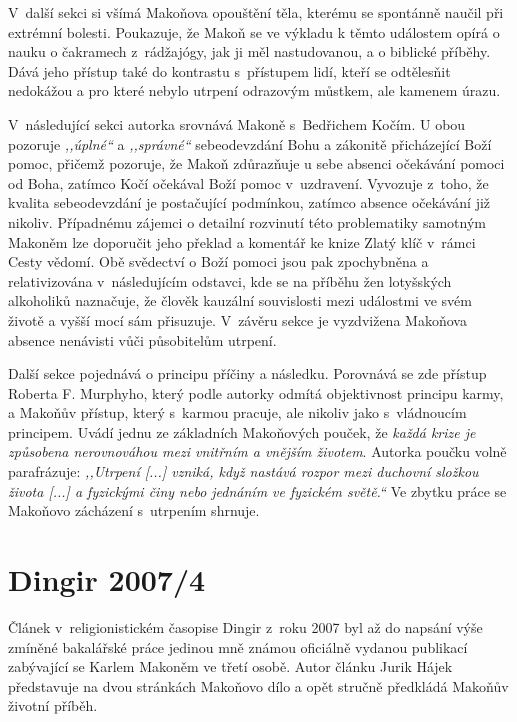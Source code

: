 V~další sekci si všímá Makoňova opouštění těla, kterému se spontánně
naučil při extrémní bolesti. Poukazuje, že Makoň se ve výkladu k těmto událostem
opírá o nauku o čakramech z~rádžajógy, jak ji měl nastudovanou, a o biblické
příběhy. Dává jeho přístup také do kontrastu s~přístupem lidí, kteří se
odtělesňit nedokážou a pro které nebylo utrpení odrazovým můstkem, ale kamenem úrazu.

V~následující sekci autorka srovnává Makoně s~Bedřichem Kočím. U obou pozoruje
\textit{,,úplné``} a \textit{,,správné``} sebeodevzdání Bohu a zákonitě
přicházející Boží pomoc, přičemž pozoruje, že Makoň zdůrazňuje u sebe absenci
očekávání pomoci od Boha, zatímco Kočí očekával Boží pomoc v~uzdravení. Vyvozuje
z~toho, že kvalita sebeodevzdání je postačující podmínkou, zatímco absence
očekávání již nikoliv. Případnému zájemci o detailní rozvinutí této problematiky
samotným Makoněm lze doporučit jeho překlad a komentář ke knize Zlatý
klíč\cite{fox1931golden} v~rámci Cesty vědomí\cite{KaMaCV2}. Obě
svědectví o Boží pomoci jsou pak zpochybněna a relativizována v~následujícím
odstavci, kde se na příběhu žen lotyšských alkoholiků naznačuje, že člověk
kauzální souvislosti mezi událostmi ve svém životě a vyšší mocí sám přisuzuje.
V~závěru sekce je vyzdvižena Makoňova absence nenávisti vůči působitelům
utrpení.

Další sekce pojednává o principu příčiny a následku. Porovnává se zde přístup
Roberta F. Murphyho\cite{murphy2001body}, který podle autorky odmítá objektivnost principu karmy, a
Makoňův přístup, který s~karmou pracuje, ale nikoliv jako s~vládnoucím
principem. Uvádí jednu ze základních Makoňových pouček, že \textit{každá krize
je způsobena nerovnováhou mezi vnitřním a vnějším životem}. Autorka poučku volně
parafrázuje: \textit{,,Utrpení [...] vzniká, když nastává rozpor mezi duchovní
složkou života [...] a fyzickými činy nebo jednáním ve fyzickém světě.``}
Ve zbytku práce se Makoňovo zácházení s~utrpením shrnuje.

\section{Dingir 2007/4}

Článek v~religionistickém časopise Dingir z~roku 2007\cite{hajek2007cesky} byl
až do napsání výše zmíněné bakalářské práce jedinou mně známou oficiálně vydanou
publikací zabývající se Karlem Makoněm ve třetí osobě. Autor článku Jurik Hájek
představuje na dvou stránkách Makoňovo dílo a opět stručně předkládá Makoňův
životní příběh.


